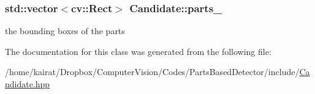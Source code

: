 \hypertarget{classCandidate_aa0e3d40adf86bff2e99f3e4234ce674b}{}
\subsubsection[{parts\+\_\+}]{\setlength{\rightskip}{0pt plus 5cm}std\+::vector$<$cv\+::\+Rect$>$ Candidate\+::parts\+\_\+\hspace{0.3cm}{\ttfamily [private]}}\label{classCandidate_aa0e3d40adf86bff2e99f3e4234ce674b}


the bounding boxes of the parts 



The documentation for this class was generated from the following file\+:\begin{DoxyCompactItemize}
\item 
/home/kairat/\+Dropbox/\+Computer\+Vision/\+Codes/\+Parts\+Based\+Detector/include/\hyperlink{Candidate_8hpp}{Candidate.\+hpp}\end{DoxyCompactItemize}
